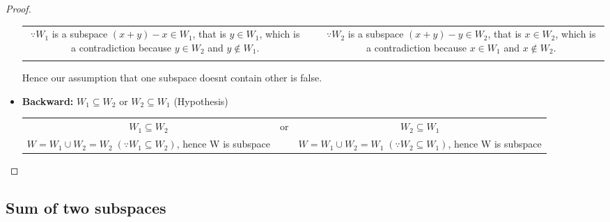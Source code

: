 \documentclass[a4paper, titlepage]{article}
\begin{document}
\begin{proof}
\begin{itemize}
\begin{tabularx}{\linewidth}{c c c}
\begin{minipage}[c]{0.45\linewidth}
                    $\because W_1$ is a subspace $(x + y) - x \in W_1$, 
                    that is $y \in W_1$, which is a contradiction because
                    $y \in W_2$ and $y \notin W_1$.
                \end{minipage}
                &
                &
                \begin{minipage}[c]{0.45\linewidth}
                    $\because W_2$ is a subspace $(x + y) - y \in W_2$, 
                    that is $x \in W_2$, which is a contradiction because
                    $x \in W_1$ and $x \notin W_2$.
                \end{minipage} \\ \\
            \end{tabularx}
            Hence our assumption that one subspace doesnt contain
            other is false.
            \item \textbf{Backward: } $W_1 \subseteq W_2$ or 
            $W_2 \subseteq W_1$ (Hypothesis) \hfill \\
            \begin{tabularx}{\linewidth}{c c c}
                $W_1 \subseteq W_2$
                &
                or
                &
                $W_2 \subseteq W_1$ \\
                \begin{minipage}[c]{0.45\linewidth}
                    $W = W_1 \cup W_2 = W_2 \; (\because W_1 \subseteq W_2)$, 
                    hence W is subspace
                \end{minipage}
                &
                &
                \begin{minipage}[c]{0.45\linewidth}
                    $W = W_1 \cup W_2 = W_1 \; (\because W_2 \subseteq W_1)$, 
                    hence W is subspace
                \end{minipage}
            \end{tabularx}
        \end{itemize}
    \end{proof}

    \subsection{Sum of two subspaces}
    
\end{document}
